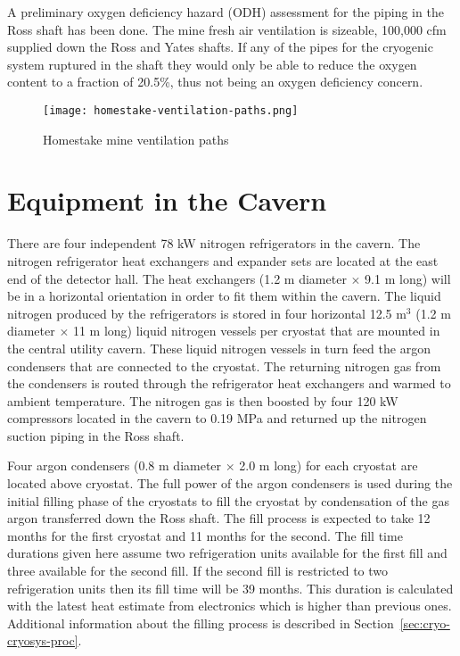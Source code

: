 A preliminary oxygen deficiency hazard (ODH) assessment for the piping in the Ross shaft has
been done. The mine fresh air ventilation is sizeable, 100,000 cfm supplied down the Ross and
Yates shafts. If any of the pipes for the cryogenic system ruptured in the shaft they would only
be able to reduce the oxygen content to a fraction of 20.5\%, thus not being an oxygen
deficiency concern.

\begin{figure}[htbp]
\centering
\texttt{[image: homestake-ventilation-paths.png]} 
\caption{Homestake mine ventilation paths}
\label{fig:ventilation-paths}
\end{figure}


\chapter{Equipment in the Cavern}
\label{sec:cryo-cryosys-equip-cavern}

There are four independent 78 kW nitrogen refrigerators in the cavern. The nitrogen
refrigerator heat exchangers and expander sets are located at the east end of the detector hall.
The heat exchangers (1.2 m diameter $\times$ 9.1 m long) will be in a horizontal orientation in order to
fit them within the cavern. The liquid nitrogen produced by the refrigerators is stored in
four horizontal 12.5 m$^3$ (1.2 m diameter $\times$ 11 m long) liquid nitrogen vessels per cryostat that are mounted in the
central utility cavern. These liquid nitrogen vessels
in turn feed the argon condensers that are connected to the cryostat. The returning nitrogen
gas from the condensers is routed through the refrigerator heat exchangers and warmed to
ambient temperature. The nitrogen gas is then boosted by four 120 kW compressors located in
the cavern to 0.19 MPa and returned up the nitrogen suction piping in the Ross shaft.

 Four argon condensers (0.8 m diameter $\times$ 2.0 m long) for each cryostat are located above cryostat. The full power of the argon condensers is used during the initial 
filling phase of the cryostats to fill the cryostat by condensation of the gas argon transferred 
down the Ross shaft. The fill process is expected to take 12 months for the first cryostat and 11 months for the second. 
The fill time durations given here assume two refrigeration units available for the first fill and three available for the second fill. If the second fill is restricted to two refrigeration units then its fill time will be 39 months. This duration is calculated with the latest heat estimate from electronics which is higher than previous ones. Additional information about the filling process is described in
Section~\ref{sec:cryo-cryosys-proc}.  

